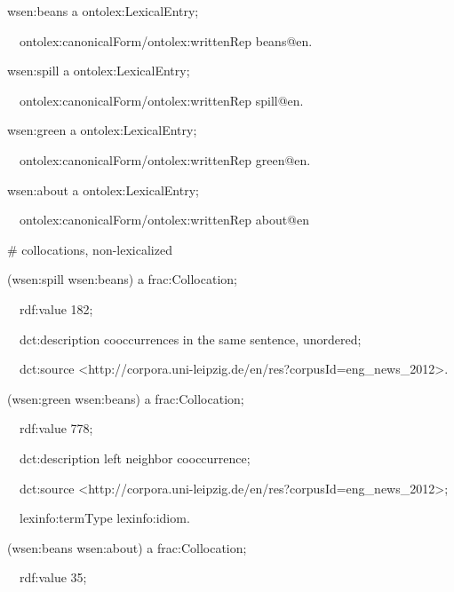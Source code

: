 \documentclass[a4paper]{article}
\newcommand\textstyleSourceText[1]{\textrm{#1}}
\begin{document}
\textstyleSourceText{wsen:beans a ontolex:LexicalEntry;}

\textstyleSourceText{\ \ ontolex:canonicalForm/ontolex:writtenRep {\textquotedbl}beans{\textquotedbl}@en.}

\textstyleSourceText{wsen:spill a ontolex:LexicalEntry;}

\textstyleSourceText{\ \ ontolex:canonicalForm/ontolex:writtenRep {\textquotedbl}spill{\textquotedbl}@en.}

\textstyleSourceText{wsen:green a ontolex:LexicalEntry;}

\textstyleSourceText{\ \ ontolex:canonicalForm/ontolex:writtenRep {\textquotedbl}green{\textquotedbl}@en.}

\textstyleSourceText{wsen:about a ontolex:LexicalEntry;}

\textstyleSourceText{\ \ ontolex:canonicalForm/ontolex:writtenRep {\textquotedbl}about{\textquotedbl}@en}


\bigskip

\textstyleSourceText{\# collocations, non-lexicalized}

\textstyleSourceText{(wsen:spill wsen:beans) a frac:Collocation;}

\textstyleSourceText{\ \ rdf:value {\textquotedbl}182{\textquotedbl};}

\textstyleSourceText{\ \ dct:description {\textquotedbl}cooccurrences in the same sentence, unordered{\textquotedbl};}

\textstyleSourceText{\ \ dct:source {\textless}http://corpora.uni-leipzig.de/en/res?corpusId=eng\_news\_2012{\textgreater}.}


\bigskip

\textstyleSourceText{(wsen:green wsen:beans) a frac:Collocation;}

\textstyleSourceText{\ \ rdf:value {\textquotedbl}778{\textquotedbl};}

\textstyleSourceText{\ \ dct:description {\textquotedbl}left neighbor cooccurrence{\textquotedbl};}

\textstyleSourceText{\ \ dct:source {\textless}http://corpora.uni-leipzig.de/en/res?corpusId=eng\_news\_2012{\textgreater};}

\textstyleSourceText{\ \ lexinfo:termType lexinfo:idiom.}


\bigskip

\textstyleSourceText{(wsen:beans wsen:about) a frac:Collocation;}

\textstyleSourceText{\ \ rdf:value {\textquotedbl}35{\textquotedbl};}
\end{document}
